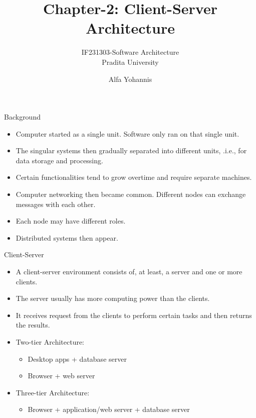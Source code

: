 \documentclass{beamer}
\title{Chapter-2: Client-Server Architecture}
\subtitle{IF231303-Software Architecture\\Pradita University}
\author{Alfa Yohannis}
\begin{document}
\begin{frame}[plain]
    \maketitle
\end{frame}

\begin{frame}{Background}
\begin{itemize}
\item Computer started as a single unit.  Software only ran on that single unit.
\item The singular systems then gradually separated into different units, .i.e., for data storage and processing.
\item Certain functionalities tend to grow overtime and require separate machines.
\item Computer networking then became common. Different nodes can exchange messages with each other.
\item Each node may have different roles.
\item Distributed systems then appear.
\end{itemize}
\end{frame}

\begin{frame}{Client-Server}
\begin{itemize}
\item A client-server environment consists of, at least, a server and one or more clients.
\item The server usually has more computing power than the clients. 
\item It receives request from the clients to perform certain tasks and then returns the results.
\item Two-tier Architecture:
\begin{itemize}
\item Desktop apps + database server
\item Browser + web server
\end{itemize}
\item Three-tier Architecture:
\begin{itemize}
\item Browser + application/web server + database server
\end{itemize}
\end{itemize}
\end{frame}
\end{document}
